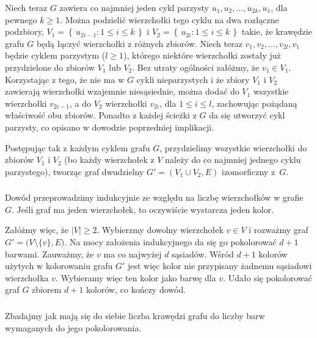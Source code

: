 Niech teraz $G$ zawiera co najmniej jeden cykl parzysty $u_1,u_2,\dots,u_{2k},u_1$, dla pewnego $k\ge1$. Można podzielić wierzchołki tego cyklu na dwa rozłączne podzbiory, $V_1 = \left\{\,u_{2i-1}:1\le i\le k\,\right\}$ i $V_2 = \left\{\,u_{2i}:1\le i\le k\,\right\}$ takie, że krawędzie grafu $G$ będą łączyć wierzchołki z różnych zbiorów. Niech teraz $v_1,v_2,\dots,v_{2l},v_1$ będzie cyklem parzystym ($l\ge1$), którego niektóre wierzchołki zostały już przydzielone do zbiorów $V_1$ lub $V_2$. Bez utraty ogólności załóżmy, że $v_1\in V_1$. Korzystając z tego, że nie ma w $G$ cykli nieparzystych i że zbiory $V_1$ i $V_2$ zawierają wierzchołki wzajemnie niesąsiednie, można dodać do $V_1$ wszystkie wierzchołki $v_{2i-1}$, a do $V_2$ wierzchołki $v_{2i}$, dla $1\le i\le l$, zachowując pożądaną właściwość obu zbiorów. Ponadto z każdej ścieżki z $G$ da się utworzyć cykl parzysty, co opisano w dowodzie poprzedniej implikacji.

Postępując tak z każdym cyklem grafu $G$, przydzielimy wszystkie wierzchołki do zbiorów $V_1$ i $V_2$ (bo każdy wierzchołek z $V$ należy do co najmniej jednego cyklu parzystego), tworząc graf dwudzielny $G'=(V_1\cup V_2,E)$ izomorficzny z~$G$.

\subsubsection{} %
Dowód przeprowadzimy indukcyjnie ze względu na liczbę wierzchołków w grafie $G$. Jeśli graf ma jeden wierzchołek, to oczywiście wystarcza jeden kolor.

Załóżmy więc, że $|V|\ge2$. Wybierzmy dowolny wierzchołek $v\in V$ i rozważmy graf $G'=\bigl(V\setminus\{v\},E\bigr)$. Na mocy założenia indukcyjnego da się go pokolorować $d+1$ barwami. Zauważmy, że $v$ ma co najwyżej $d$ sąsiadów. Wśród $d+1$ kolorów użytych w kolorowaniu grafu $G'$ jest więc kolor nie przypisany żadnemu sąsiadowi wierzchołka $v$. Wybieramy więc ten kolor jako barwę dla $v$. Udało się pokolorować graf $G$ zbiorem $d+1$ kolorów, co kończy dowód.

\subsubsection{} %
Zbadajmy jak mają się do siebie liczba krawędzi grafu do liczby barw wymaganych do jego pokolorowania.

